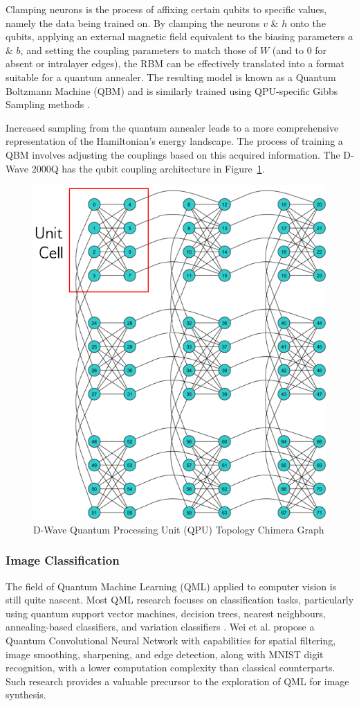 \documentclass[%
 reprint,
 amsmath,amssymb,
 aps,
]{revtex4-2}
\begin{document}
Clamping neurons is the process of affixing certain qubits to specific values, namely the data being trained on. By clamping the neurons $v$ \& $h$ onto the qubits, applying an external magnetic field equivalent to the biasing parameters $a$ \& $b$, and setting the coupling parameters to match those of $W$ (and to 0 for absent or intralayer edges), the RBM can be effectively translated into a format suitable for a quantum annealer. The resulting model is known as a Quantum Boltzmann Machine (QBM) and is similarly trained using QPU-specific Gibbs Sampling methods \cite{dwavedocs}\cite{qpugibbs}.



Increased sampling from the quantum annealer leads to a more comprehensive representation of the Hamiltonian's energy landscape. The process of training a QBM involves adjusting the couplings based on this acquired information. The D-Wave 2000Q has the qubit coupling architecture in Figure~\ref{fig:chimera}.

\begin{figure}[h]
    \includegraphics[width=0.7\columnwidth]{chimera.png}
    \caption{\label{fig:chimera} D-Wave Quantum Processing Unit (QPU) Topology Chimera Graph \cite{dwavedocs}}
\end{figure}

\subsubsection{Image Classification}
The field of Quantum Machine Learning (QML) applied to computer vision is still quite nascent. Most QML research focuses on classification tasks, particularly using quantum support vector machines, decision trees, nearest neighbours, annealing-based classifiers, and variation classifiers \cite{classifiers}.  Wei et al. propose a Quantum Convolutional Neural Network with capabilities for spatial filtering, image smoothing, sharpening, and edge detection, along with MNIST digit recognition, with a lower computation complexity than classical counterparts\cite{quantumCNN}. Such research provides a valuable precursor to the exploration of QML for image synthesis.
\end{document}
